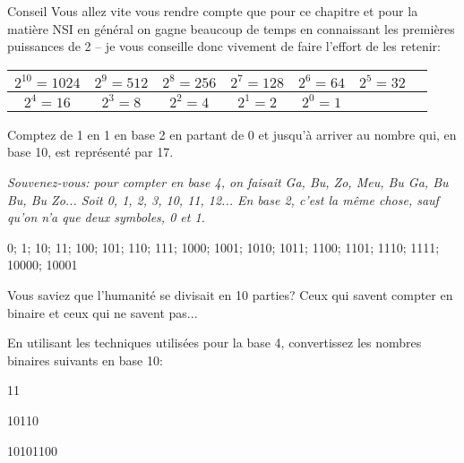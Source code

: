 \documentclass[12pt]{article}
\begin{document}
	\begin{MonAmp}{Conseil}
		Vous allez vite vous rendre compte que pour ce chapitre et pour la matière NSI en général on gagne beaucoup de temps en connaissant les premières puissances de 2 -- je vous conseille donc vivement de faire l'effort de les retenir:
	\end{MonAmp}
	
	  \begin{tabular}{|c|c|c|c|c|c|c|}
		\hline
		$2^{10} = 1024$ & $2^9 = 512$ & $2^8 = 256$ & $2^7 = 128$ & $2^6 = 64$ & $2^5 = 32$ \\
		\hline
		$2^4 = 16$ & $2^3 = 8$ & $2^2 = 4$ & $2^1 = 2$ & $2^0 = 1$ &\\
		\hline
	\end{tabular}

	\begin{MonExo}
		Comptez de 1 en 1 en base 2 en partant de 0 et jusqu’à arriver au nombre qui, en base 10, est représenté par 17.
		
		\textit{Souvenez-vous: pour compter en base 4, on faisait Ga, Bu, Zo, Meu, Bu Ga, Bu Bu, Bu Zo... Soit 0, 1, 2, 3, 10, 11, 12... En base 2, c'est la même chose, sauf qu'on n'a que deux symboles, 0 et 1.}
	\end{MonExo}
	\begin{MaReponse}
		0; 1; 10; 11; 100; 101; 110; 111; 1000; 1001; 1010; 1011; 1100; 1101; 1110; 1111; 10000; 10001
		
		Vous saviez que l'humanité se divisait en 10 parties? Ceux qui savent compter en binaire et ceux qui ne savent pas...
	\end{MaReponse}
	
	\begin{MonExo}
		En utilisant les techniques utilisées pour la base 4, convertissez les nombres binaires suivants en base 10:
		\begin{alphenum}
			\item 11
			\item 10110
			\item 10101100
		\end{alphenum}
	\end{MonExo}
\end{document}
